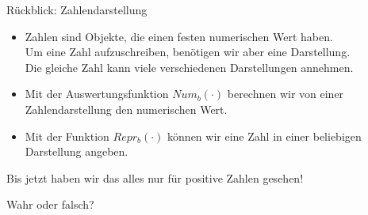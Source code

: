 
\newcommand{\mydate}{25.11.2016}

\newcommand{\handout}{}




\usepackage{graphicx}
\graphicspath{{../figures/}}




\framePrevEpisode

\begin{frame}{Rückblick: Zahlendarstellung}
	\begin{itemize}
		\item Zahlen sind Objekte, die einen festen numerischen Wert haben.\\
			Um eine Zahl aufzuschreiben, benötigen wir aber eine Darstellung. \\
			Die gleiche Zahl kann viele verschiedenen Darstellungen annehmen.
		\item Mit der Auswertungsfunktion $Num_b(\cdot)$ berechnen wir von einer Zahlendarstellung den numerischen Wert.
		\item Mit der Funktion $Repr_b(\cdot)$ können wir eine Zahl in einer beliebigen Darstellung angeben.
	\end{itemize}
	
	Bis jetzt haben wir das alles nur für positive Zahlen gesehen!
\end{frame}

\begin{frame}
	\begin{block}{Wahr oder falsch?}
	\begin{itemize}
	\end{itemize}
	\end{block}	
\end{frame}

